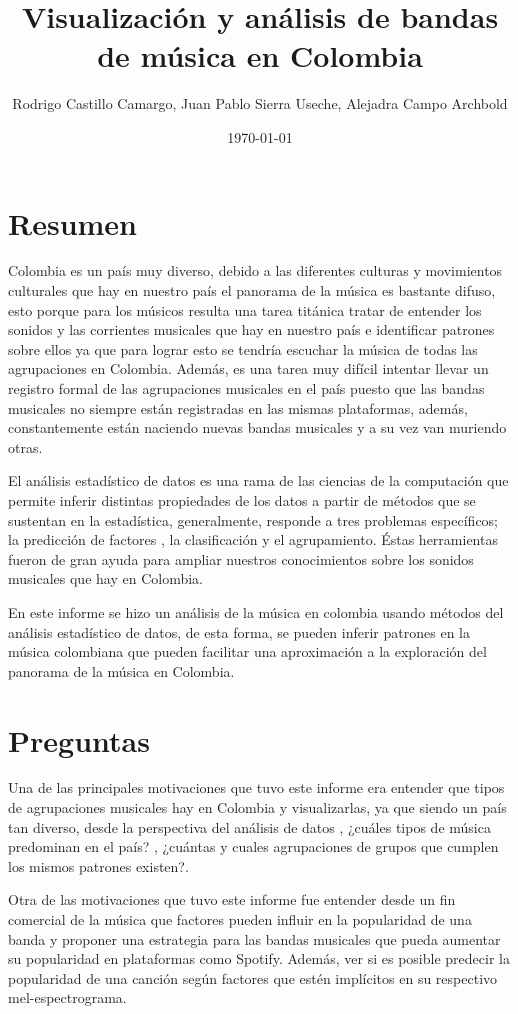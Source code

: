 \documentclass[11pt]{article}
\author{Rodrigo Castillo Camargo, Juan Pablo Sierra Useche, Alejadra Campo Archbold}
\date{\today}
\title{Visualización y análisis de bandas de música en Colombia}
\begin{document}
\maketitle
\tableofcontents


\section{Resumen}
\label{sec:orgecf4b10}
Colombia es un país muy diverso, debido a las diferentes culturas y movimientos culturales que hay en nuestro país el panorama de la música es bastante difuso, esto porque para los músicos resulta una tarea titánica tratar de entender los sonidos y las corrientes musicales que hay en nuestro país e identificar patrones sobre ellos ya que para lograr esto se tendría escuchar la música de todas las agrupaciones en Colombia. Además, es una tarea muy difícil intentar llevar un registro formal de las agrupaciones musicales en el país puesto que las bandas musicales no siempre están registradas en las mismas plataformas, además, constantemente están naciendo nuevas bandas musicales y a su vez van muriendo otras.

El análisis estadístico de datos es una rama de las ciencias de la computación que permite inferir distintas propiedades de los datos a partir de métodos que se sustentan en la estadística, generalmente, responde a tres problemas específicos; la predicción  de factores , la clasificación y el agrupamiento. Éstas herramientas fueron de gran ayuda para ampliar nuestros conocimientos sobre los sonidos musicales que hay en Colombia.

En este informe se hizo un análisis de la música en colombia usando métodos del análisis estadístico de datos, de esta forma, se pueden inferir patrones en la música colombiana que pueden facilitar una aproximación a la exploración del panorama de la música en Colombia.

\section{Preguntas}
\label{sec:org4ce41e6}
Una de las principales motivaciones que tuvo este informe era entender que tipos de agrupaciones musicales hay en Colombia y visualizarlas, ya que siendo un país tan diverso, desde la perspectiva del análisis de datos , ¿cuáles tipos de música predominan en el país? , ¿cuántas y cuales agrupaciones de grupos que cumplen los mismos patrones existen?.

Otra de las motivaciones que tuvo este informe fue entender desde un fin comercial de la música que factores pueden influir en la popularidad de una banda y proponer una estrategia para las bandas musicales que pueda aumentar su popularidad en plataformas como Spotify. Además, ver si es posible predecir la popularidad de una canción según factores que estén implícitos en su respectivo mel-espectrograma.
\end{document}
